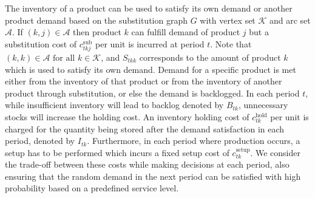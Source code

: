 \documentclass[11pt]{article}
\newcommand{\ti}{t} %
\newcommand{\ka}{k} %
\newcommand{\KA}{\mathcal{K}}
\newcommand{\jey}{j} %
\newcommand{\Graf}{\mathcal{A}} %
\newcommand{\Bi}{B} %
\begin{document}
The inventory of a product can be used to satisfy its own demand or another product demand based on the substitution graph $G$ with vertex set $\KA$ and arc set $\Graf$. If $(\ka, \jey) \in \Graf$ then product $\ka$  can fulfill demand of product $\jey$ but a substitution cost of $c^{\text{sub}}_{\ti \ka \jey }$ per unit is incurred at period $\ti$. Note that $(\ka, \ka) \in \Graf  \text{ for all } \ka \in \KA$, and $S_{\ti \ka \ka}$ corresponds to the amount of product $\ka$ which is used to satisfy its own demand.  Demand for a specific product is met either from the inventory of that product or from the inventory of another product through substitution, or else the demand is backlogged. In each period $\ti$, while insufficient inventory will lead to backlog denoted by $\Bi_{\ti \ka}$, unnecessary stocks will increase the holding cost. An inventory holding cost of $c^{\text{hold}}_{\ti \ka}$ per unit is charged for the quantity being stored after the demand satisfaction in each period, denoted by $I_{\ti \ka}$. Furthermore, in each period where production occurs, a setup has to be performed which incurs a fixed setup cost of $c^{\text{setup}}_{\ti \ka}$. We consider the trade-off between these costs while making decisions at each period, also ensuring that the random demand in the next period can be satisfied with high probability based on a predefined service level. 






\end{document}
